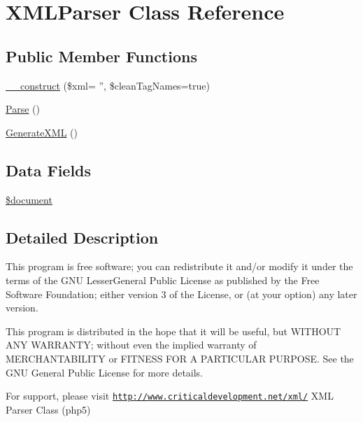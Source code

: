 \hypertarget{class_x_m_l_parser}{\section{\-X\-M\-L\-Parser \-Class \-Reference}
\label{class_x_m_l_parser}
}
\subsection*{\-Public \-Member \-Functions}
\begin{DoxyCompactItemize}
\item 
\hyperlink{class_x_m_l_parser_ae6f0c7e9725120daf08378e6841a3e06}{\-\_\-\-\_\-construct} (\$xml= '', \$clean\-Tag\-Names=true)
\item 
\hyperlink{class_x_m_l_parser_a28c6b0e02eadd28d12f24682e722f5de}{\-Parse} ()
\item 
\hyperlink{class_x_m_l_parser_abc3bdfba197d54f6a37b9cf7950e00ad}{\-Generate\-X\-M\-L} ()
\end{DoxyCompactItemize}
\subsection*{\-Data \-Fields}
\begin{DoxyCompactItemize}
\item 
\hyperlink{class_x_m_l_parser_ac5a31edb787609a3143dec9bfa8063ea}{\$document}
\end{DoxyCompactItemize}


\subsection{\-Detailed \-Description}
\-This program is free software; you can redistribute it and/or modify it under the terms of the \-G\-N\-U \-Lesser\-General \-Public \-License as published by the \-Free \-Software \-Foundation; either version 3 of the \-License, or (at your option) any later version.

\-This program is distributed in the hope that it will be useful, but \-W\-I\-T\-H\-O\-U\-T \-A\-N\-Y \-W\-A\-R\-R\-A\-N\-T\-Y; without even the implied warranty of \-M\-E\-R\-C\-H\-A\-N\-T\-A\-B\-I\-L\-I\-T\-Y or \-F\-I\-T\-N\-E\-S\-S \-F\-O\-R \-A \-P\-A\-R\-T\-I\-C\-U\-L\-A\-R \-P\-U\-R\-P\-O\-S\-E. \-See the \-G\-N\-U \-General \-Public \-License for more details.

\-For support, please visit \href{http://www.criticaldevelopment.net/xml/}{\tt http\-://www.\-criticaldevelopment.\-net/xml/} \-X\-M\-L \-Parser \-Class (php5)

